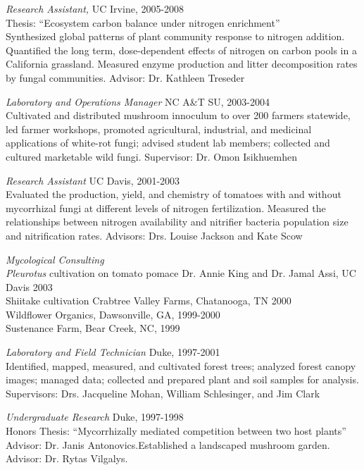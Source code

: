 \documentclass[line,10pt]{res}
\begin{document}
\begin{resume}
               {\sl  Research Assistant, } \hfill UC Irvine, 2005-2008 \\
 Thesis: ``Ecosystem carbon balance under nitrogen enrichment''\\
                Synthesized global patterns of plant community response to nitrogen addition. Quantified the long term, dose-dependent effects of nitrogen on carbon pools in a California grassland. Measured enzyme production and litter decomposition rates by fungal communities. Advisor: Dr. Kathleen Treseder
              
                {\sl Laboratory and Operations Manager} \hfill NC A\&T SU, 2003-2004 \\
                 Cultivated and distributed mushroom innoculum to over 200 farmers statewide, led farmer workshops, promoted agricultural, industrial, and medicinal applications of white-rot fungi; advised student lab members; collected and cultured marketable wild fungi. Supervisor: Dr. Omon Isikhuemhen

               {\sl  Research Assistant} \hfill UC Davis, 2001-2003 \\
   Evaluated the production, yield, and chemistry of tomatoes with and without mycorrhizal fungi at different levels of nitrogen fertilization. Measured the relationships between nitrogen availability and nitrifier bacteria population size and nitrification rates. Advisors: Drs. Louise Jackson and  Kate Scow
                 
                {\sl Mycological Consulting}  \\
                 \textit{Pleurotus} cultivation on tomato pomace \hfill Dr. Annie King and Dr. Jamal Assi, UC Davis 2003\\ Shiitake cultivation \hfill Crabtree Valley Farms, Chatanooga, TN 2000\\ \phantom{} \hfill Wildflower Organics, Dawsonville, GA, 1999-2000 \\ \phantom{} \hfill Sustenance Farm, Bear Creek, NC, 1999

                 {\sl Laboratory and Field Technician} \hfill  Duke, 1997-2001\\
 Identified, mapped, measured, and cultivated forest trees; analyzed forest canopy images; managed data; collected and prepared plant and soil samples for analysis. Supervisors: Drs. Jacqueline Mohan, William Schlesinger, and Jim Clark

                 {\sl Undergraduate Research} \hfill  Duke, 1997-1998\\
        Honors Thesis: ``Mycorrhizally mediated competition between two host plants'' Advisor: Dr. Janis Antonovics.Established a landscaped mushroom garden. Advisor: Dr. Rytas Vilgalys.


\end{resume}
\end{document}
